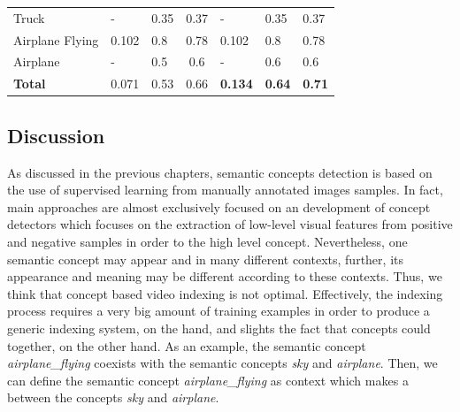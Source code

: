 \begin{table}[h]
\begin{tabular}{lp{1.2cm}p{1.2cm}p{1.2cm}p{1.2cm}p{1.2cm}p{1.2cm}}
\multicolumn{1}{l|}{Truck}                                               & -                         & 0.35                     & \multicolumn{1}{c|}{0.37}                & -                                  & 0.35                              & 0.37                              \\
\multicolumn{1}{l|}{Airplane Flying}                                     & 0.102                     & 0.8                      & \multicolumn{1}{c|}{0.78}                & 0.102                              & 0.8                               & 0.78                              \\
\multicolumn{1}{l|}{Airplane}                                            & -                         & 0.5                      & \multicolumn{1}{c|}{0.6}                 & -                                  & 0.6                               & 0.6                               \\ \hline\hline
\textbf{Total}                                                           & \multicolumn{1}{|l}{0.071}  & 0.53 & \multicolumn{1}{l|}{0.66}                & \multicolumn{1}{l}{\textbf{0.134}} & \multicolumn{1}{l}{\textbf{0.64}} & \multicolumn{1}{l}{\textbf{0.71}} \\ \hline
\end{tabular}
\end{table}


		\subsection{Discussion}

		As discussed in the previous chapters, semantic concepts detection is based on the use of supervised 
		learning from manually annotated images samples. In fact, main approaches are almost exclusively focused 
		on an  development of concept detectors which focuses on the extraction of low-level visual 
		features from positive and negative samples in order to  the high level concept. Nevertheless, 
		one semantic concept may appear and  in many different contexts, further, its appearance and 
		meaning may be different according to these contexts. Thus, we think that concept based video indexing 
		is not optimal. Effectively, the indexing process requires a very big amount of training examples 
		in order to produce a generic indexing system, on the  hand, and slights the fact that concepts could 
		 together, on the other hand. As an example, the semantic concept \emph{airplane\_{}flying} 
		coexists with the semantic concepts \emph{sky} and \emph{airplane}. Then, we can define the semantic 
		concept \emph{airplane\_{}flying} as context which makes a  between the concepts \emph{sky} 
		and \emph{airplane}. 

